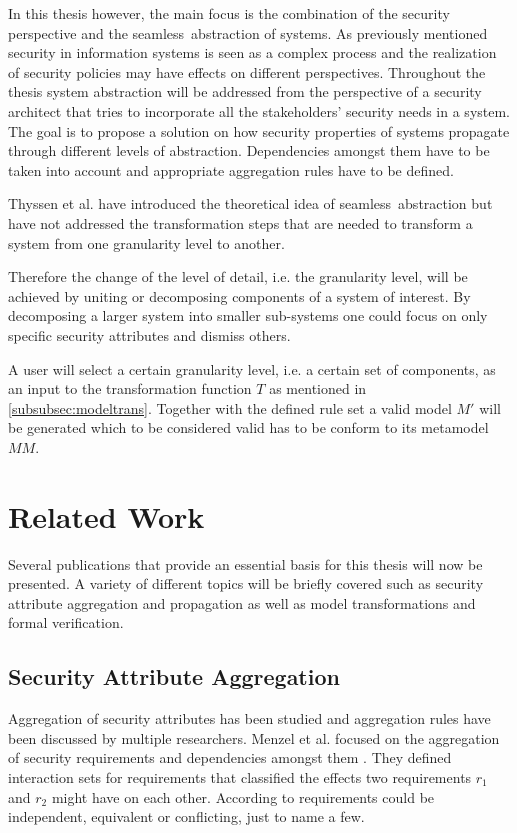 In this thesis however, the main focus is the combination of the security perspective and the \glqq seamless\grqq \ abstraction of systems. As previously mentioned security in information systems is seen as a complex process \cite{vacca2012computer} and the realization of security policies may have effects on different perspectives. Throughout the thesis system abstraction will be addressed from the perspective of a security architect that tries to incorporate all the stakeholders' security needs in a system. The goal is to propose a solution on how security properties of systems propagate through different levels of abstraction. Dependencies amongst them have to be taken into account and appropriate aggregation rules have to be defined. 

Thyssen et al. have introduced the theoretical idea of \glqq seamless\grqq \ abstraction but have not addressed the transformation steps that are needed to transform a system from one granularity level to another.  
  
Therefore the change of the level of detail, i.e. the granularity level, will be achieved by uniting or decomposing components of a system of interest. By decomposing a larger system into smaller sub-systems one could focus on only specific security attributes and dismiss others.

A user will select a certain granularity level, i.e. a certain set of components, as an input to the transformation function $T$ as mentioned in \ref{subsubsec:modeltrans}. Together with the defined rule set a valid model $M'$ will be generated which to be considered valid has to be conform to its metamodel $MM$.

\section{Related Work}
\label{sec:related_work}

Several publications that provide an essential basis for this thesis will now be presented. A variety of different topics will be briefly covered such as security attribute aggregation and propagation as well as model transformations and formal verification. 

\subsection{Security Attribute Aggregation}
\label{subsec:aggregation}
Aggregation of security attributes has been studied and aggregation rules have been discussed by multiple researchers. Menzel et al. focused on the aggregation of security requirements and dependencies amongst them \cite{Menzel2008}. They defined interaction sets for requirements that classified the effects two requirements $r_1$ and $r_2$ might have on each other. According to \cite{Menzel2008} requirements could be independent, equivalent or conflicting, just to name a few.

